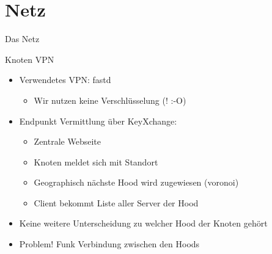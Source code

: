 \section{Netz}
\begin{frame}{}
    \begin{center}
        Das Netz
     \end{center}
\end{frame}

\begin{frame}{Knoten VPN}
    \begin{itemize}
        \item Verwendetes VPN: fastd
        \begin{itemize}
            \item {\small{}Wir nutzen keine Verschlüsselung (! :-O)}
        \end{itemize}
        \item Endpunkt Vermittlung über KeyXchange:
        \begin{itemize}
            \item Zentrale Webseite 
            \item Knoten meldet sich mit Standort
            \item Geographisch nächste Hood wird zugewiesen (voronoi)
            \item Client bekommt Liste aller Server der Hood
        \end{itemize}
        \item<3> Keine weitere Unterscheidung zu welcher Hood der Knoten gehört
        \item<3> {\color{red}Problem!} Funk Verbindung zwischen den Hoods
    \end{itemize}
\end{frame}

